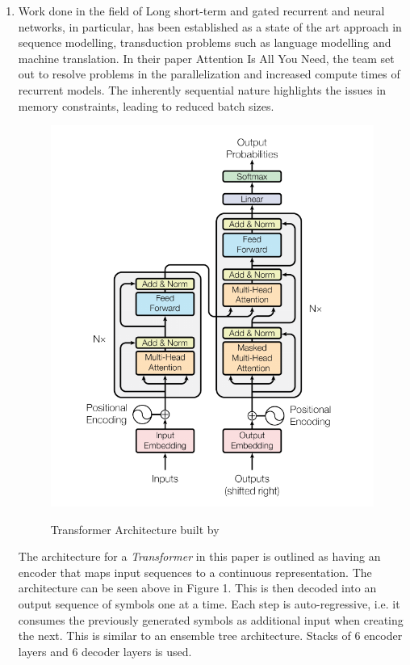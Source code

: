 \documentclass[11pt]{article}
\begin{document}
\begin{enumerate}
		\item Work done in the field of Long short-term and gated recurrent \citep{lstm} and \citep{recurrent} neural networks, in particular, has been established as a state of the art approach in sequence modelling, transduction problems such as language modelling and machine translation.
		In their paper Attention Is All You Need,\citep{atayl} the team set out to resolve problems in the parallelization and increased compute times of recurrent models. The inherently sequential nature highlights the issues in memory constraints, leading to reduced batch sizes.
		\begin{figure}[h!]
			\centering
			\includegraphics[scale=0.4]{transformer.png}
			\label{fig1}
			\caption{Transformer Architecture built by \citep{atayl}}
		\end{figure}
		The architecture for a \textit{Transformer} in this paper is outlined as having an encoder that maps input sequences to a continuous representation. The architecture can be seen above in Figure 1. This is then decoded into an output sequence of symbols one at a time. Each step is auto-regressive, i.e. it consumes the previously generated symbols as additional input when creating the next. This is similar to an ensemble tree architecture. Stacks of 6 encoder layers and 6 decoder layers is used.\\

\end{enumerate}
\end{document}

